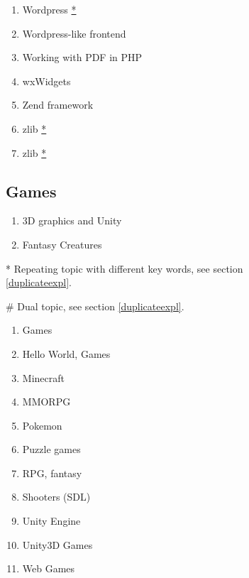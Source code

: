 \documentclass[conference,10pt]{IEEEtran}
\begin{document}
\begin{figure}[H]
\begin{multicols}{2}
\begin{enumerate}
    \item Wordpress \hyperref[duplicate]{*}
    \item Wordpress-like frontend
    \item Working with PDF in PHP
    \item wxWidgets
    \item Zend framework
    \item zlib \hyperref[duplicate]{*}
    \item zlib \hyperref[duplicate]{*}
    \setcounter{topics}{\value{enumi}}
 \end{enumerate}
 \end{multicols}
 \subsection{Games}
 \begin{multicols}{2}
 \begin{enumerate}
    \setcounter{enumi}{\value{topics}}
    \item 3D graphics and Unity
    \item Fantasy Creatures
    \setcounter{topics}{\value{enumi}}
 \end{enumerate}
 \end{multicols}
 \end{figure}
 \begin{figure}[H]
 \small\label{duplicate}* Repeating topic with different key words, see section \ref{duplicateexpl}.
 
 \label{dual}\# Dual topic, see section \ref{duplicateexpl}.
 \end{figure}
 \begin{figure}[H]
 \begin{multicols}{2}
 \begin{enumerate}
    \setcounter{enumi}{\value{topics}}
    \item Games
    \item Hello World, Games
    \item Minecraft
    \item MMORPG
    \item Pokemon
    \item Puzzle games
    \item RPG, fantasy
    \item Shooters (SDL)
    \item Unity Engine
    \item Unity3D Games
    \item Web Games
\end{enumerate}
\end{multicols}
\end{figure}
\end{document}
